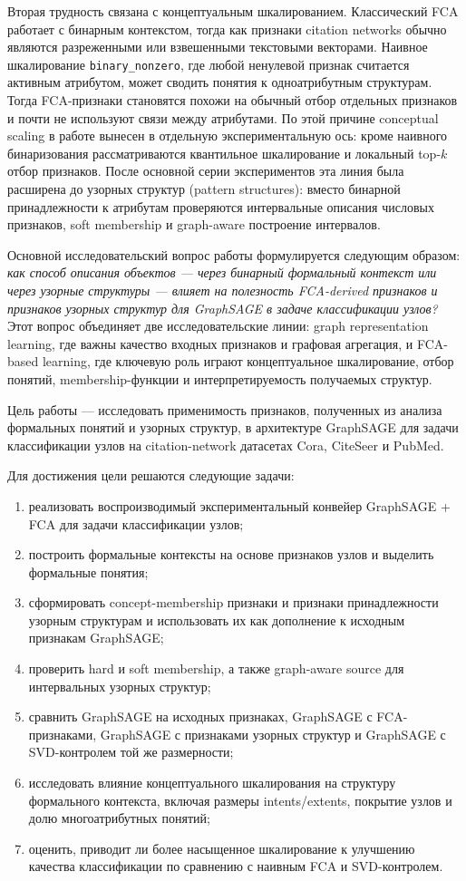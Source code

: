 \documentclass[14pt,a4paper]{extarticle}
\begin{document}
Вторая трудность связана с концептуальным шкалированием. Классический FCA
работает с бинарным контекстом, тогда как признаки citation networks обычно
являются разреженными или взвешенными текстовыми векторами. Наивное шкалирование
\texttt{binary\_nonzero}, где любой ненулевой признак считается активным
атрибутом, может сводить понятия к одноатрибутным структурам. Тогда FCA-признаки
становятся похожи на обычный отбор отдельных признаков и почти не используют
связи между атрибутами. По этой причине conceptual scaling в работе вынесен в
отдельную экспериментальную ось: кроме наивного бинаризования рассматриваются
квантильное шкалирование и локальный top-$k$ отбор признаков. После основной
серии экспериментов эта линия была расширена до узорных структур (pattern
structures): вместо бинарной принадлежности к атрибутам проверяются интервальные
описания числовых признаков, soft membership и graph-aware построение интервалов.

Основной исследовательский вопрос работы формулируется следующим образом:
\textit{как способ описания объектов --- через бинарный формальный контекст или
через узорные структуры --- влияет на полезность FCA-derived признаков и
признаков узорных структур для GraphSAGE в задаче классификации узлов?} Этот
вопрос объединяет две исследовательские линии: graph representation learning, где
важны качество входных признаков и графовая агрегация, и FCA-based learning, где
ключевую роль играют концептуальное шкалирование, отбор понятий,
membership-функции и интерпретируемость получаемых структур.

Цель работы --- исследовать применимость признаков, полученных из анализа
формальных понятий и узорных структур, в архитектуре GraphSAGE для
задачи классификации узлов на citation-network датасетах Cora, CiteSeer и
PubMed.

Для достижения цели решаются следующие задачи:
\begin{enumerate}[label=\arabic*)]
    \item реализовать воспроизводимый экспериментальный конвейер GraphSAGE + FCA
    для задачи классификации узлов;
    \item построить формальные контексты на основе признаков узлов и выделить
    формальные понятия;
    \item сформировать concept-membership признаки и признаки принадлежности
    узорным структурам и
    использовать их как дополнение к исходным признакам GraphSAGE;
    \item проверить hard и soft membership, а также graph-aware source для
    интервальных узорных структур;
    \item сравнить GraphSAGE на исходных признаках, GraphSAGE с FCA-признаками,
    GraphSAGE с признаками узорных структур и GraphSAGE с SVD-контролем той же
    размерности;
    \item исследовать влияние концептуального шкалирования на структуру
    формального контекста, включая размеры intents/extents, покрытие узлов и долю
    многоатрибутных понятий;
    \item оценить, приводит ли более насыщенное шкалирование к улучшению качества
    классификации по сравнению с наивным FCA и SVD-контролем.
\end{enumerate}
\end{document}
